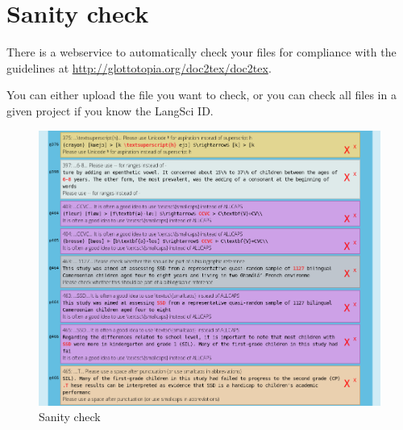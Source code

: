 \chapter{Sanity check}
There is a webservice to automatically check your files for compliance with the guidelines at
\url{http://glottotopia.org/doc2tex/doc2tex}.

You can either upload the file you want to check, or you can check all files in a given project if you know the LangSci ID. 

\begin{figure}
 \caption{Sanity check}
\includegraphics[width=\textwidth]{sanitycheck.png}
\end{figure}

